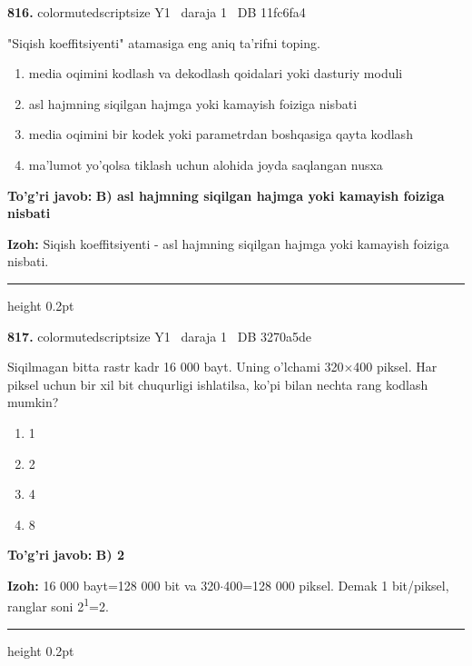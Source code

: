 \documentclass[10pt,a4paper,oneside]{article}
\begin{document}
\noindent\textbf{\color{ink}816.}  {color{muted}scriptsize Y1 \textbullet\ daraja 1 \textbullet\ DB 11fc6fa4}
\par
"Siqish koeffitsiyenti" atamasiga eng aniq ta'rifni toping.
\begin{enumerate}[label=\Alph*),leftmargin=9mm]
\item media oqimini kodlash va dekodlash qoidalari yoki dasturiy moduli
\item asl hajmning siqilgan hajmga yoki kamayish foiziga nisbati
\item media oqimini bir kodek yoki parametrdan boshqasiga qayta kodlash
\item ma'lumot yo'qolsa tiklash uchun alohida joyda saqlangan nusxa
\end{enumerate}
\begin{tcolorbox}[enhanced,breakable,colback=teal!4,colframe=teal!50!black,boxrule=0.5pt,arc=1.1mm,left=3mm,right=3mm,top=1.7mm,bottom=1.7mm,before skip=2mm,after skip=2mm]
\textbf{\color{teal}To'g'ri javob:} \textbf{B) asl hajmning siqilgan hajmga yoki kamayish foiziga nisbati}
\par\smallskip
\textbf{Izoh:} Siqish koeffitsiyenti - asl hajmning siqilgan hajmga yoki kamayish foiziga nisbati.
\end{tcolorbox}
\vspace{2mm}\hrule height 0.2pt \vspace{3mm}

\noindent\textbf{\color{ink}817.}  {color{muted}scriptsize Y1 \textbullet\ daraja 1 \textbullet\ DB 3270a5de}
\par
Siqilmagan bitta rastr kadr 16 000 bayt. Uning o'lchami 320\ensuremath{\times}400 piksel. Har piksel uchun bir xil bit chuqurligi ishlatilsa, ko'pi bilan nechta rang kodlash mumkin?
\begin{enumerate}[label=\Alph*),leftmargin=9mm]
\item 1
\item 2
\item 4
\item 8
\end{enumerate}
\begin{tcolorbox}[enhanced,breakable,colback=teal!4,colframe=teal!50!black,boxrule=0.5pt,arc=1.1mm,left=3mm,right=3mm,top=1.7mm,bottom=1.7mm,before skip=2mm,after skip=2mm]
\textbf{\color{teal}To'g'ri javob:} \textbf{B) 2}
\par\smallskip
\textbf{Izoh:} 16 000 bayt=128 000 bit va 320\ensuremath{\cdot}400=128 000 piksel. Demak 1 bit/piksel, ranglar soni 2\textsuperscript{1}=2.
\end{tcolorbox}
\vspace{2mm}\hrule height 0.2pt \vspace{3mm}
\end{document}
